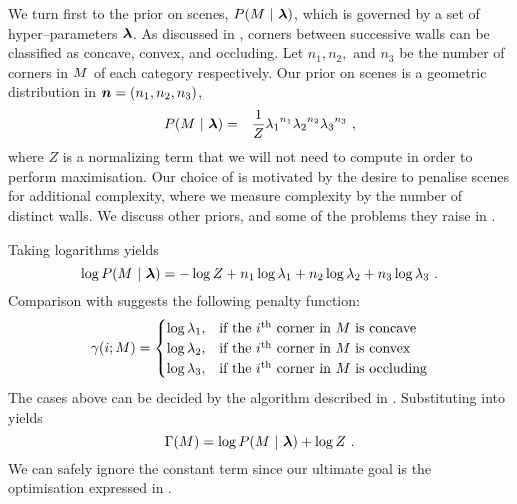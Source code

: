 We turn first to the prior on scenes, $P(\Scene~|~\Penalties)$, which
is governed by a set of hyper--parameters $\Penalties$. As discussed in
, corners between successive walls can be
classified as concave, convex, and occluding. Let $n_1, n_2,$ and $n_3$
be the number of corners in $\Scene$ of each category
respectively. Our prior on scenes is a geometric distribution in
$\vect{n}=(n_1,n_2,n_3)$,
\begin{eqnarray}
  \label{eq:scene-prior}
  P(\Scene ~|~ \Penalties) &=& \frac{1}{Z}
    {\PenaltyConc}^{n_1} {\PenaltyConv}^{n_2} {\PenaltyOccl}^{n_3}~,
\end{eqnarray}
where $Z$ is a normalizing term that we will not need to compute in
order to perform maximisation. Our choice of  is
motivated by the desire to penalise scenes for additional complexity,
where we measure complexity by the number of distinct walls. We
discuss other priors, and some of the problems they raise in
.

Taking logarithms yields
\begin{equation}
  \label{eq:log-scene-prior}
  \log P(\Scene ~|~ \Penalties) =
    -\log Z +
    n_1\log\PenaltyConc + 
    n_2\log\PenaltyConv + 
    n_3\log\PenaltyOccl~.
\end{equation}
Comparison with  suggests the following
penalty function:
\begin{equation}
  \label{eq:corner-penalty}
  \CornerPenalty(i;\Scene) = 
  \begin{cases}
    \log \PenaltyConc, &
      \mbox{if the $i$\th corner in $\Scene$ is concave} \\
    \log \PenaltyConv, &
      \mbox{if the $i$\th corner in $\Scene$ is convex} \\
    \log \PenaltyOccl, &
      \mbox{if the $i$\th corner in $\Scene$ is occluding} \\
  \end{cases}
\end{equation}
The cases above can be decided by the algorithm described in
. Substituting  into
 yields
\begin{equation}
  \ScenePenalty(\Scene) = \log P(\Scene ~|~ \Penalties) + \log Z~.
\end{equation}
We can safely ignore the constant term since our ultimate goal is the
optimisation expressed in .

